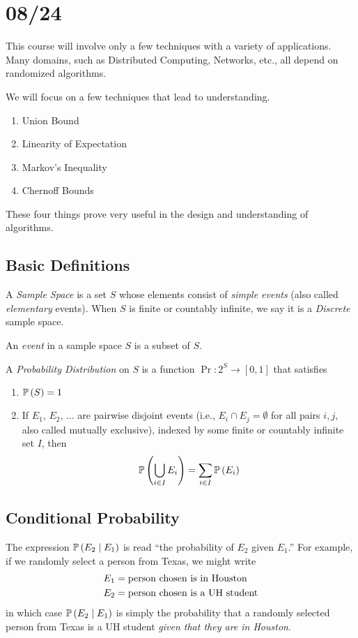 \section{08/24}
This course will involve only a few techniques with a variety of applications.
Many domains, such as Distributed Computing, Networks, etc., all depend on
randomized algorithms.

We will focus on a few techniques that lead to understanding.
\begin{enumerate}
    \item Union Bound
    \item Linearity of Expectation
    \item Markov's Inequality
    \item Chernoff Bounds
\end{enumerate}
These four things prove very useful in the design and understanding of
algorithms.

\subsection{Basic Definitions}
\begin{definition}
    A \emph{Sample Space} is a set $S$ whose elements consist of \emph{simple
    events} (also called \emph{elementary} events). When $S$ is finite or
    countably infinite, we say it is a \emph{Discrete} sample space.
\end{definition}

\begin{definition}
    An \emph{event} in a sample space $S$ is a subset of $S$.
\end{definition}

\begin{definition}
    A \emph{Probability Distribution} on $S$ is a function $\Pr: 2^S \to [0, 1]$
    that satisfies
    \begin{enumerate}
        \item $\operatorname{\mathbb{P}}\left(S\right) = 1$
        \item If $E_1$, $E_2$, $\dots$ are pairwise disjoint events (i.e., $E_i
        \cap E_j = \emptyset$ for all pairs $i, j$, also called mutually
        exclusive), indexed by some finite or countably infinite set $I$, then
        \[\operatorname{\mathbb{P}}\left(\bigcup_{i \in I} E_i\right) = \sum_{i \in I} \operatorname{\mathbb{P}}\left(E_i\right)\]
    \end{enumerate}
\end{definition}

\subsection{Conditional Probability}
The expression $\operatorname{\mathbb{P}}\left(E_2 \mid E_1\right)$ is read ``the probability of $E_2$ given
$E_1$.'' For example, if we randomly select a person from Texas, we might write
\begin{align*}
    E_1 &= \hbox{person chosen is in Houston}\\
    E_2 &= \hbox{person chosen is a UH student}
\end{align*}
in which case $\operatorname{\mathbb{P}}\left(E_2 \mid E_1\right)$ is simply the probability that a randomly
selected person from Texas is a UH student \emph{given that they are in
Houston}.

